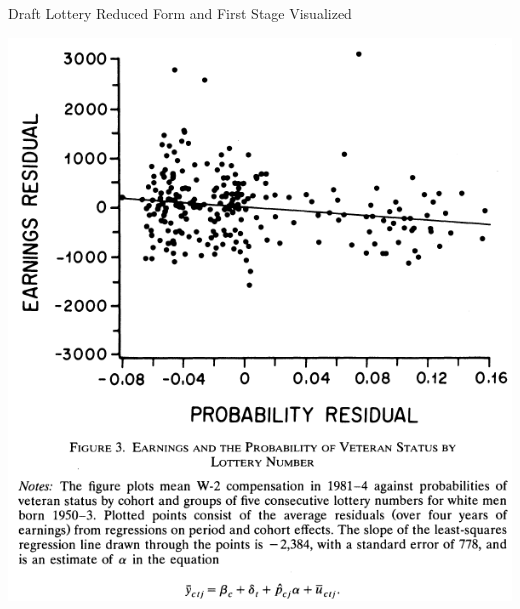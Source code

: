 \documentclass{beamer}
\begin{document}
\begin{frame}{Draft Lottery Reduced Form and First Stage Visualized}

\vspace{-0.45cm}
\begin{center}
\includegraphics[scale=0.5]{./lecture_includes/angrist_1990_2.png}
\end{center}

\end{frame}
\end{document}
